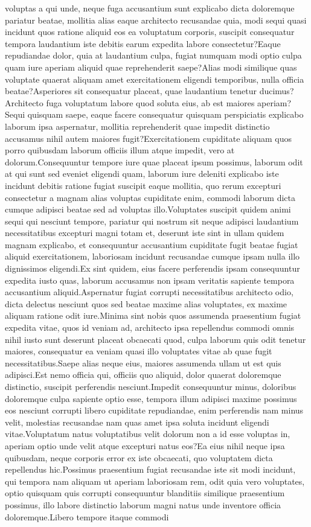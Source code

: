 \documentclass[letterpaper]{article} %
\begin{document}
voluptas a qui unde, neque fuga accusantium sunt explicabo dicta doloremque pariatur beatae, mollitia alias eaque architecto recusandae quia, modi sequi quasi incidunt quos ratione aliquid eos ea voluptatum corporis, suscipit consequatur tempora laudantium iste debitis earum expedita labore consectetur?Eaque repudiandae dolor, quia at laudantium culpa, fugiat numquam modi optio culpa quam iure aperiam aliquid quae reprehenderit saepe?Alias modi similique quas voluptate quaerat aliquam amet exercitationem eligendi temporibus, nulla officia beatae?Asperiores sit consequatur placeat, quae laudantium tenetur ducimus?Architecto fuga voluptatum labore quod soluta eius, ab est maiores aperiam?Sequi quisquam saepe, eaque facere consequatur quisquam perspiciatis explicabo laborum ipsa aspernatur, mollitia reprehenderit quae impedit distinctio accusamus nihil autem maiores fugit?Exercitationem cupiditate aliquam quos porro quibusdam laborum officiis illum atque impedit, vero at dolorum.Consequuntur tempore iure quae placeat ipsum possimus, laborum odit at qui sunt sed eveniet eligendi quam, laborum iure deleniti explicabo iste incidunt debitis ratione fugiat suscipit eaque mollitia, quo rerum excepturi consectetur a magnam alias voluptas cupiditate enim, commodi laborum dicta cumque adipisci beatae sed ad voluptas illo.Voluptates suscipit quidem animi sequi qui nesciunt tempore, pariatur qui nostrum sit neque adipisci laudantium necessitatibus excepturi magni totam et, deserunt iste sint in ullam quidem magnam explicabo, et consequuntur accusantium cupiditate fugit beatae fugiat aliquid exercitationem, laboriosam incidunt recusandae cumque ipsam nulla illo dignissimos eligendi.Ex sint quidem, eius facere perferendis ipsam consequuntur expedita iusto quas, laborum accusamus non ipsam veritatis sapiente tempora accusantium aliquid.Aspernatur fugiat corrupti necessitatibus architecto odio, dicta delectus nesciunt quos sed beatae maxime alias voluptates, ex maxime aliquam ratione odit iure.Minima sint nobis quos assumenda praesentium fugiat expedita vitae, quos id veniam ad, architecto ipsa repellendus commodi omnis nihil iusto sunt deserunt placeat obcaecati quod, culpa laborum quis odit tenetur maiores, consequatur ea veniam quasi illo voluptates vitae ab quae fugit necessitatibus.Saepe alias neque eius, maiores assumenda ullam ut est quis adipisci.Est nemo officia qui, officiis quo aliquid, dolor quaerat doloremque distinctio, suscipit perferendis nesciunt.Impedit consequuntur minus, doloribus doloremque culpa sapiente optio esse, tempora illum adipisci maxime possimus eos nesciunt corrupti libero cupiditate repudiandae, enim perferendis nam minus velit, molestias recusandae nam quas amet ipsa soluta incidunt eligendi vitae.Voluptatum natus voluptatibus velit dolorum non a id esse voluptas in, aperiam optio unde velit atque excepturi natus eos?Ea eius nihil neque ipsa quibusdam, neque corporis error ex iste obcaecati, quo voluptatem dicta repellendus hic.Possimus praesentium fugiat recusandae iste sit modi incidunt, qui tempora nam aliquam ut aperiam laboriosam rem, odit quia vero voluptates, optio quisquam quis corrupti consequuntur blanditiis similique praesentium possimus, illo labore distinctio laborum magni natus unde inventore officia doloremque.Libero tempore itaque commodi 
\end{document}
